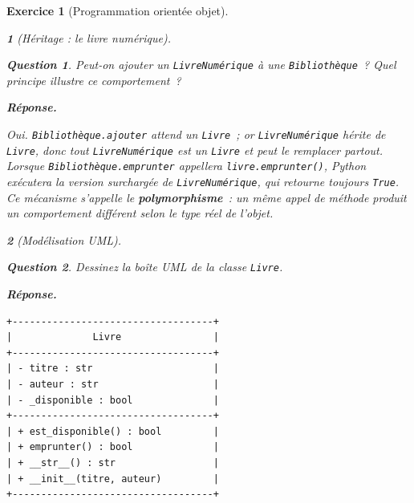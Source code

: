 \documentclass{article}
\theoremstyle{exostyle}
\newtheorem{exo}{Exercice}
\theoremstyle{partiestyle}
\newtheorem{partie}{}[exo]
\theoremstyle{questionstyle}
\newtheorem{questionpartie}{Question}[partie]
\newenvironment{reponse}{%
    \par\smallskip\noindent\textbf{Réponse.}\enspace\ignorespaces
}{%
    \par\smallskip
}
\begin{document}
\begin{exo}[Programmation orientée objet]
\begin{partie}[Héritage : le livre numérique]
        \begin{questionpartie}
            Peut-on ajouter un \texttt{LivreNumérique} à une \texttt{Bibliothèque}~? Quel principe illustre ce comportement~?
        \end{questionpartie}
        \begin{reponse}
            Oui. \texttt{Bibliothèque.ajouter} attend un \texttt{Livre}~; or \texttt{LivreNumérique} hérite de \texttt{Livre}, donc tout \texttt{LivreNumérique} \textit{est} un \texttt{Livre} et peut le remplacer partout. Lorsque \texttt{Bibliothèque.emprunter} appellera \texttt{livre.emprunter()}, Python exécutera la version surchargée de \texttt{LivreNumérique}, qui retourne toujours \texttt{True}. Ce mécanisme s'appelle le \textbf{polymorphisme}~: un même appel de méthode produit un comportement différent selon le type réel de l'objet.
        \end{reponse}

    \end{partie}

    \begin{partie}[Modélisation UML]

        \begin{questionpartie}
            Dessinez la boîte UML de la classe \texttt{Livre}.
        \end{questionpartie}
        \begin{reponse}
\begin{verbatim}
+-----------------------------------+
|              Livre                |
+-----------------------------------+
| - titre : str                     |
| - auteur : str                    |
| - _disponible : bool              |
+-----------------------------------+
| + est_disponible() : bool         |
| + emprunter() : bool              |
| + __str__() : str                 |
| + __init__(titre, auteur)         |
+-----------------------------------+
\end{verbatim}
        \end{reponse}


\end{partie}
\end{exo}
\end{document}
